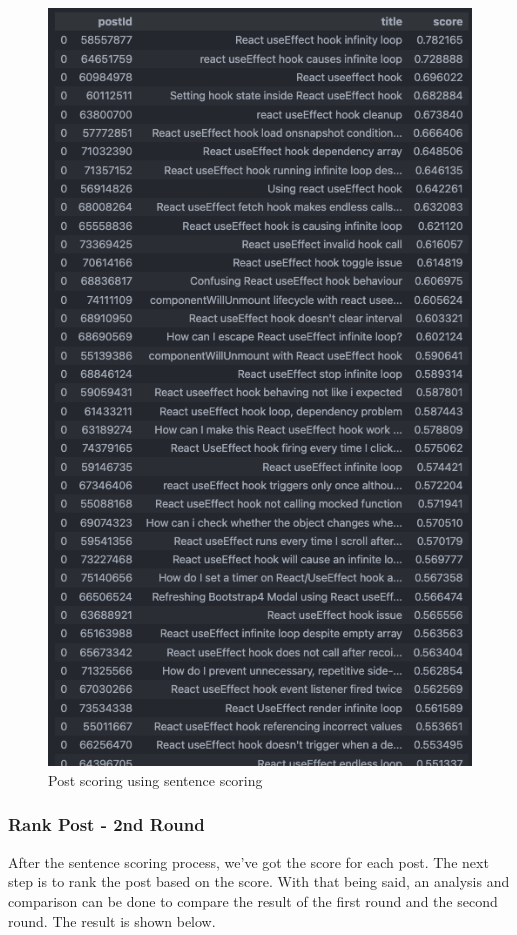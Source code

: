 \begin{figure}[H]
  \noindent \includegraphics[scale=0.45]{assets/spacy-query-1-results.png}

\caption{Post scoring using sentence scoring }\label{scoring_sentence}
\end{figure}

\subsubsection*{Rank Post - 2nd Round}
After the sentence scoring process, we've got the score for each post. The next step is to rank the post based on the score. With that being said, an analysis and comparison can be done to compare the result of the first round and the second round. The result is shown below.

